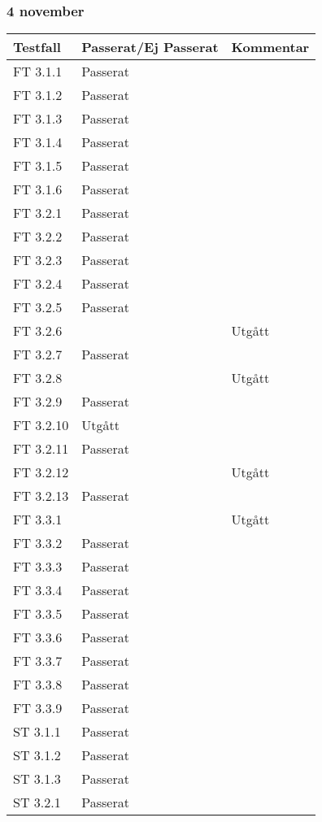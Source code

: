 \documentclass[a4paper]{article}
\begin{document}
\subsubsection{4 november}
\begin{tabular}{| l | l | p{9cm} |}
\hline
Testfall &  Passerat/Ej Passerat & Kommentar\\
\hline
FT 3.1.1 & Passerat & \\
\hline
FT 3.1.2 & Passerat & \\
\hline
FT 3.1.3 & Passerat & \\
\hline
FT 3.1.4 & Passerat & \\
\hline
FT 3.1.5 & Passerat & \\
\hline
FT 3.1.6 & Passerat & \\
\hline
FT 3.2.1 & Passerat & \\
\hline
FT 3.2.2 & Passerat & \\
\hline
FT 3.2.3 & Passerat & \\
\hline
FT 3.2.4 & Passerat & \\
\hline
FT 3.2.5 & Passerat & \\
\hline
FT 3.2.6 &  & Utgått\\
\hline
FT 3.2.7 & Passerat & \\
\hline
FT 3.2.8 &  & Utgått\\
\hline
FT 3.2.9 & Passerat &  \\
\hline
FT 3.2.10 & Utgått & \\
\hline
FT 3.2.11 & Passerat & \\
\hline
FT 3.2.12 &  & Utgått\\
\hline
FT 3.2.13 & Passerat & \\
\hline
FT 3.3.1 &  & Utgått\\
\hline
FT 3.3.2 & Passerat & \\
\hline
FT 3.3.3 & Passerat & \\
\hline
FT 3.3.4 & Passerat & \\
\hline
FT 3.3.5 & Passerat & \\
\hline
FT 3.3.6 & Passerat & \\
\hline
FT 3.3.7 & Passerat & \\
\hline
FT 3.3.8 & Passerat & \\
\hline
FT 3.3.9 & Passerat & \\
\hline
ST 3.1.1 & Passerat & \\
\hline
ST 3.1.2 & Passerat & \\
\hline
ST 3.1.3 & Passerat & \\
\hline
ST 3.2.1 & Passerat & \\
\hline
\end{tabular}
\end{document}
